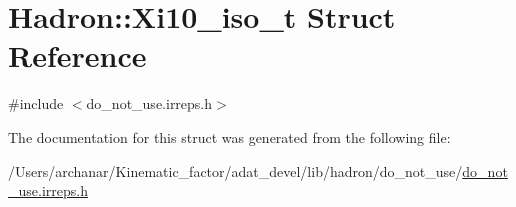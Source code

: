 \hypertarget{structHadron_1_1Xi10__iso__t}{}\section{Hadron\+:\+:Xi10\+\_\+iso\+\_\+t Struct Reference}
\label{structHadron_1_1Xi10__iso__t}


{\ttfamily \#include $<$do\+\_\+not\+\_\+use.\+irreps.\+h$>$}



The documentation for this struct was generated from the following file\+:\begin{DoxyCompactItemize}
\item 
/\+Users/archanar/\+Kinematic\+\_\+factor/adat\+\_\+devel/lib/hadron/do\+\_\+not\+\_\+use/\mbox{\hyperlink{do__not__use_8irreps_8h}{do\+\_\+not\+\_\+use.\+irreps.\+h}}\end{DoxyCompactItemize}

